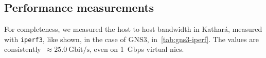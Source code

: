 \subsection{Performance measurements}

For completeness, we measured the host to host bandwidth in Kathará, measured with \texttt{iperf3}, like shown, in the case of GNS3, in~\ref{tab:gns3-iperf}.
The values are consistently~$\approx 25.0~\mbox{Gbit/s}$, even on 1~Gbps virtual \glspl{nic}.

